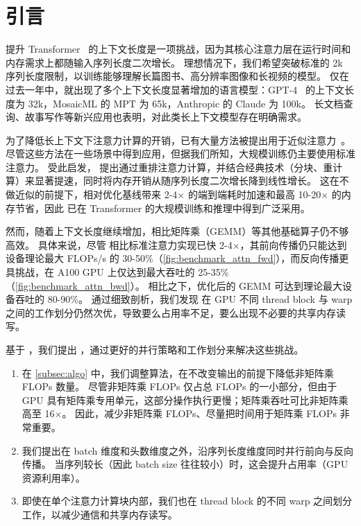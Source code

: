 \section{引言}
\label{sec:intro}

提升 Transformer~\citep{vaswani2017attention} 的上下文长度是一项挑战，因为其核心注意力层在运行时间和内存需求上都随输入序列长度二次增长。
理想情况下，我们希望突破标准的 2k 序列长度限制，以训练能够理解长篇图书、高分辨率图像和长视频的模型。
仅在过去一年中，就出现了多个上下文长度显著增加的语言模型：GPT-4~\citep{OpenAI2023GPT4TR} 的上下文长度为 32k，MosaicML 的 MPT 为 65k，Anthropic 的 Claude 为 100k。
长文档查询、故事写作等新兴应用也表明，对此类长上下文模型存在明确需求。

为了降低长上下文下注意力计算的开销，已有大量方法被提出用于近似注意力~\citep{kitaev2020reformer, roy2021efficient, wang2020linformer,
  katharopoulos2020transformers, choromanski2020rethinking,
  beltagy2020longformer, zaheer2020bigbird, scatterbrain}。
尽管这些方法在一些场景中得到应用，但据我们所知，大规模训练仍主要使用标准注意力。
受此启发，\citet{dao2022flashattention} 提出通过重排注意力计算，并结合经典技术（分块、重计算）来显著提速，同时将内存开销从随序列长度二次增长降到线性增长。
这在不做近似的前提下，相对优化基线带来 2-4$\times$ 的端到端耗时加速和最高 10-20$\times$ 的内存节省，因此 \sysnameone 已在 Transformer 的大规模训练和推理中得到广泛采用。

然而，随着上下文长度继续增加，\sysnameone 相比矩阵乘（GEMM）等其他基础算子仍不够高效。
具体来说，尽管 \sysnameone 相比标准注意力实现已快 2-4$\times$，其前向传播仍只能达到设备理论最大 FLOPs/s 的 30-50\%（\cref{fig:benchmark_attn_fwd}），而反向传播更具挑战，在 A100 GPU 上仅达到最大吞吐的 25-35\%（\cref{fig:benchmark_attn_bwd}）。
相比之下，优化后的 GEMM 可达到理论最大设备吞吐的 80-90\%。
通过细致剖析，我们发现 \sysnameone 在 GPU 不同 thread block 与 warp 之间的工作划分仍然次优，导致要么占用率不足，要么出现不必要的共享内存读写。

基于 \sysnameone，我们提出 \sysname，通过更好的并行策略和工作划分来解决这些挑战。
\begin{enumerate}
  \item 在 \cref{subsec:algo} 中，我们调整算法，在不改变输出的前提下降低非矩阵乘 FLOPs 数量。
  尽管非矩阵乘 FLOPs 仅占总 FLOPs 的一小部分，但由于 GPU 具有矩阵乘专用单元，这部分操作执行更慢；矩阵乘吞吐可比非矩阵乘高至 16$\times$。
  因此，减少非矩阵乘 FLOPs、尽量把时间用于矩阵乘 FLOPs 非常重要。

  \item 我们提出在 batch 维度和头数维度之外，沿序列长度维度同时并行前向与反向传播。
  当序列较长（因此 batch size 往往较小）时，这会提升占用率（GPU 资源利用率）。

  \item 即使在单个注意力计算块内部，我们也在 thread block 的不同 warp 之间划分工作，以减少通信和共享内存读写。

\end{enumerate}

